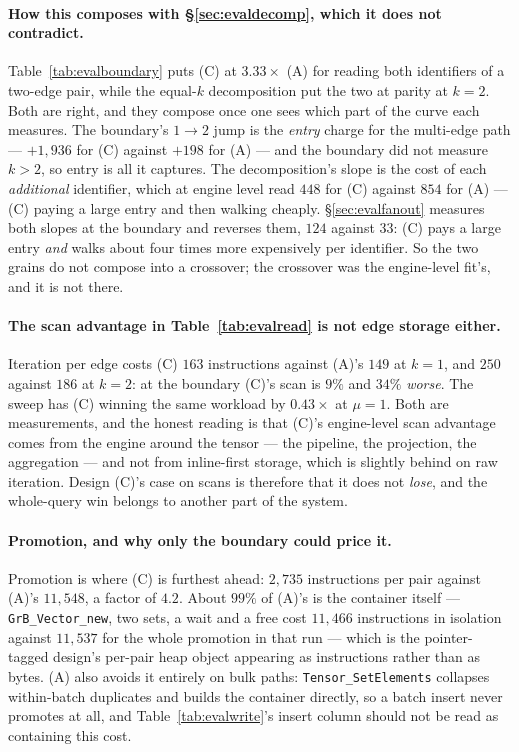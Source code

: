 \documentclass[11pt,a4paper]{article}
\theoremstyle{plain}
\theoremstyle{definition}
\theoremstyle{remark}
\begin{document}
\paragraph{How this composes with \S\ref{sec:evaldecomp}, which it does not
contradict.} Table~\ref{tab:evalboundary} puts (C) at $3.33\times$ (A) for
reading both identifiers of a two-edge pair, while the equal-$k$ decomposition
put the two at parity at $k = 2$. Both are right, and they compose once one sees
which part of the curve each measures. The boundary's $1 \to 2$ jump is the
\emph{entry} charge for the multi-edge path --- $+1{,}936$ for (C) against
$+198$ for (A) --- and the boundary did not measure $k > 2$, so entry is all it
captures. The decomposition's slope is the cost of each \emph{additional}
identifier, which at engine level read $448$ for (C) against $854$ for (A) ---
(C) paying a large entry and then walking cheaply. \S\ref{sec:evalfanout}
measures both slopes at the boundary and reverses them, $124$ against $33$: (C)
pays a large entry \emph{and} walks about four times more expensively per
identifier. So the two grains do not compose into a crossover; the crossover was
the engine-level fit's, and it is not there.

\paragraph{The scan advantage in Table~\ref{tab:evalread} is not edge storage
either.} Iteration per edge costs (C) $163$ instructions against (A)'s $149$ at
$k = 1$, and $250$ against $186$ at $k = 2$: at the boundary (C)'s scan is
$9\%$ and $34\%$ \emph{worse}. The sweep has (C) winning the same workload by
$0.43\times$ at $\mu = 1$. Both are measurements, and the honest reading is
that (C)'s engine-level scan advantage comes from the engine around the tensor
--- the pipeline, the projection, the aggregation --- and not from inline-first
storage, which is slightly behind on raw iteration. Design (C)'s case on scans
is therefore that it does not \emph{lose}, and the whole-query win belongs to
another part of the system.

\paragraph{Promotion, and why only the boundary could price it.} Promotion is
where (C) is furthest ahead: $2{,}735$ instructions per pair against (A)'s
$11{,}548$, a factor of $4.2$. About $99\%$ of (A)'s is the container itself ---
\texttt{GrB\_Vector\_new}, two sets, a wait and a free cost $11{,}466$
instructions in isolation against $11{,}537$ for the whole promotion in that run
--- which is the pointer-tagged design's per-pair heap object appearing as
instructions rather than as bytes. (A) also avoids it entirely on bulk paths:
\texttt{Tensor\_SetElements} collapses within-batch duplicates and builds the
container directly, so a batch insert never promotes at all, and
Table~\ref{tab:evalwrite}'s insert column should not be read as containing this
cost.
\end{document}
